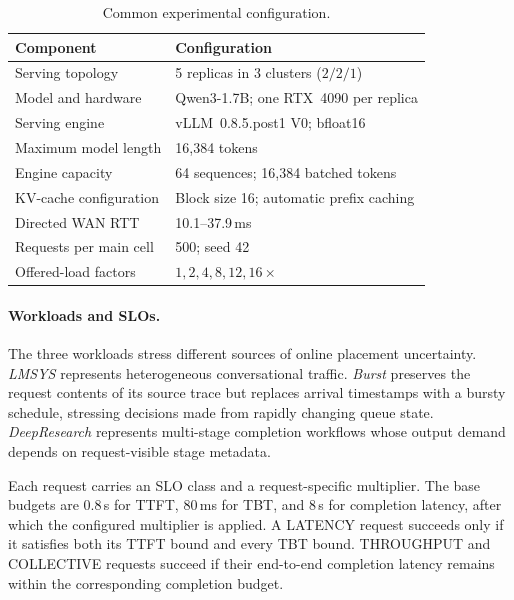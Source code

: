 \documentclass[letterpaper,twocolumn,10pt]{article}
\begin{document}
\begin{table}[t]
    \centering
    \small
    \caption{Common experimental configuration.}
    \label{tab:eval-setup}
    \setlength{\tabcolsep}{3pt}
    \renewcommand{\arraystretch}{1.08}
    \begin{tabular}{@{}p{}p{}@{}}
        \toprule
        \textbf{Component} & \textbf{Configuration} \\
        \midrule
        Serving topology
          & 5 replicas in 3 clusters ($2/2/1$) \\
        Model and hardware
          & Qwen3-1.7B; one RTX~4090 per replica \\
        Serving engine
          & vLLM~0.8.5.post1 V0; bfloat16 \\
        Maximum model length
          & 16,384 tokens \\
        Engine capacity
          & 64 sequences; 16,384 batched tokens \\
        KV-cache configuration
          & Block size 16; automatic prefix caching \\
        Directed WAN RTT
          & 10.1--37.9\,ms \\
        Requests per main cell
          & 500; seed 42 \\
        Offered-load factors
          & $1,2,4,8,12,16\times$ \\
        \bottomrule
    \end{tabular}
\end{table}

\paragraph{Workloads and SLOs.}
The three workloads stress different sources of online placement uncertainty.
\emph{LMSYS} represents heterogeneous conversational traffic.
\emph{Burst} preserves the request contents of its source trace but replaces
arrival timestamps with a bursty schedule, stressing decisions made from
rapidly changing queue state.
\emph{DeepResearch} represents multi-stage completion workflows whose output
demand depends on request-visible stage metadata.

Each request carries an SLO class and a request-specific multiplier.
The base budgets are 0.8\,s for TTFT, 80\,ms for TBT, and 8\,s for completion
latency, after which the configured multiplier is applied.
A LATENCY request succeeds only if it satisfies both its TTFT bound and every
TBT bound.
THROUGHPUT and COLLECTIVE requests succeed if their end-to-end completion
latency remains within the corresponding completion budget.
\end{document}
